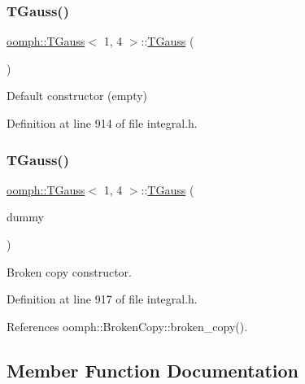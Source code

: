 \subsubsection{\texorpdfstring{T\+Gauss()}{TGauss()}\hspace{0.1cm}{\footnotesize\ttfamily [1/2]}}
{\footnotesize\ttfamily \hyperlink{classoomph_1_1TGauss}{oomph\+::\+T\+Gauss}$<$ 1, 4 $>$\+::\hyperlink{classoomph_1_1TGauss}{T\+Gauss} (\begin{DoxyParamCaption}{ }\end{DoxyParamCaption})\hspace{0.3cm}{\ttfamily [inline]}}



Default constructor (empty) 



Definition at line 914 of file integral.\+h.

\mbox{\label{classoomph_1_1TGauss_3_011_00_014_01_4_a0df634aff2c1878606ea5f5df633ba86}} 
\subsubsection{\texorpdfstring{T\+Gauss()}{TGauss()}\hspace{0.1cm}{\footnotesize\ttfamily [2/2]}}
{\footnotesize\ttfamily \hyperlink{classoomph_1_1TGauss}{oomph\+::\+T\+Gauss}$<$ 1, 4 $>$\+::\hyperlink{classoomph_1_1TGauss}{T\+Gauss} (\begin{DoxyParamCaption}\item[{const \hyperlink{classoomph_1_1TGauss}{T\+Gauss}$<$ 1, 4 $>$ \&}]{dummy }\end{DoxyParamCaption})\hspace{0.3cm}{\ttfamily [inline]}}



Broken copy constructor. 



Definition at line 917 of file integral.\+h.



References oomph\+::\+Broken\+Copy\+::broken\+\_\+copy().



\subsection{Member Function Documentation}
\mbox{\label{classoomph_1_1TGauss_3_011_00_014_01_4_a32b231a7aaa3dd5e30d0517e02a55097}} 
